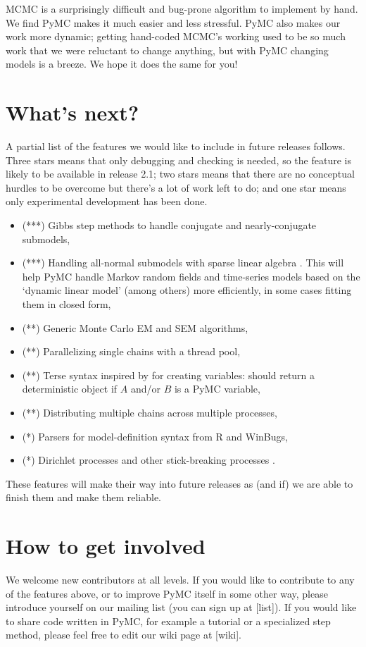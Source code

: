 
MCMC is a surprisingly difficult and bug-prone algorithm to implement by hand. We find PyMC makes it much easier and less stressful. PyMC also makes our work more dynamic; getting hand-coded MCMC's working used to be so much work that we were reluctant to change anything, but with PyMC changing models is a breeze. We hope it does the same for you!

\hypertarget{whatsnext}{}
\section*{What's next?} %

A partial list of the features we would like to include in future releases follows. Three stars means that only debugging and checking is needed, so the feature is likely to be available in release 2.1; two stars means that there are no conceptual hurdles to be overcome but there's a lot of work left to do; and one star means only experimental development has been done.
\begin{itemize}
   \item (***) Gibbs step methods to handle conjugate and nearly-conjugate submodels,
   \item (***) Handling all-normal submodels with sparse linear algebra \citep{normalsubmodel}. This will help PyMC handle Markov random fields and time-series models based on the `dynamic linear model' \citep{westharrison} (among others) more efficiently, in some cases fitting them in closed form,
   \item (**) Generic Monte Carlo EM and SEM algorithms,   
   \item (**) Parallelizing single chains with a thread pool,
   \item (**) Terse syntax inspired by \cite{fbc} for creating variables:  should return a deterministic object if $A$ and/or $B$ is a PyMC variable,   
   \item (**) Distributing multiple chains across multiple processes,
   \item (*) Parsers for model-definition syntax from R and WinBugs,
   \item (*) Dirichlet processes and other stick-breaking processes \citep{stickbreak}.
\end{itemize}
These features will make their way into future releases as (and if) we are able to finish them and make them reliable.

\hypertarget{getinvolved}{}
\section*{How to get involved} %

We welcome new contributors at all levels. If you would like to contribute to any of the features above, or to improve PyMC itself in some other way, please introduce yourself on our mailing list (you can sign up at [list]). If you would like to share code written in PyMC, for example a tutorial or a specialized step method, please feel free to edit our wiki page at [wiki]. 